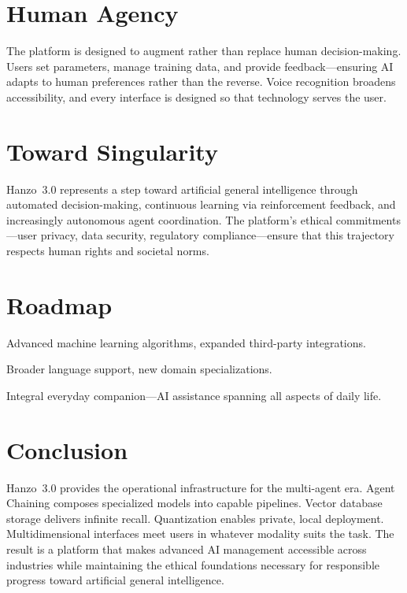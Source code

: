 \documentclass[11pt,twocolumn]{article}
\begin{document}
\section{Human Agency}
\label{sec:agency}

The platform is designed to augment rather than replace human decision-making.
Users set parameters, manage training data, and provide feedback---ensuring AI
adapts to human preferences rather than the reverse. Voice recognition broadens
accessibility, and every interface is designed so that technology serves the user.

\section{Toward Singularity}
\label{sec:singularity}

Hanzo~3.0 represents a step toward artificial general intelligence through
automated decision-making, continuous learning via reinforcement feedback, and
increasingly autonomous agent coordination. The platform's ethical commitments
---user privacy, data security, regulatory compliance---ensure that this
trajectory respects human rights and societal norms.

\section{Roadmap}
\label{sec:roadmap}

\begin{description}[leftmargin=1.1em]
    \item[Phase~I.] Advanced machine learning algorithms, expanded third-party
    integrations.
    \item[Phase~II.] Broader language support, new domain specializations.
    \item[Phase~III.] Integral everyday companion---AI assistance spanning all
    aspects of daily life.
\end{description}

\section{Conclusion}
\label{sec:conclusion}

Hanzo~3.0 provides the operational infrastructure for the multi-agent era. Agent
Chaining composes specialized models into capable pipelines. Vector database
storage delivers infinite recall. Quantization enables private, local deployment.
Multidimensional interfaces meet users in whatever modality suits the task. The
result is a platform that makes advanced AI management accessible across
industries while maintaining the ethical foundations necessary for responsible
progress toward artificial general intelligence.
\end{document}
